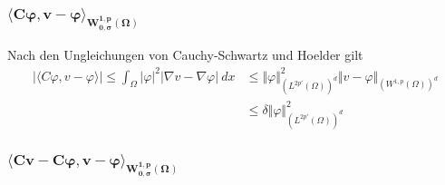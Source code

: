 \documentclass{article}
\begin{document}
\subsubsection*{$\bm{\langle C \varphi, v - \varphi \rangle_{W_{0, \sigma}^{1,p} (\Omega)}}$}

Nach den Ungleichungen von Cauchy-Schwartz und Hoelder gilt
\begin{equation*}
  \begin{aligned}
    \vert \langle C \varphi, v - \varphi \rangle\vert
    \leq \int_{\Omega}^{} \vert \varphi \vert^2 \vert \nabla v - \nabla \varphi \vert  \ dx
    &\leq \Vert \varphi \Vert_{(L^{2 p'}(\Omega))^d}^2 \Vert v - \varphi \Vert_{(W^{1, p}(\Omega))^d} \\
    &\leq \delta \Vert \varphi \Vert_{(L^{2 p'}(\Omega))^d}^2 
  \end{aligned}
\end{equation*}

\subsubsection*{$\bm{\langle Cv - C \varphi, v - \varphi \rangle_{W_{0, \sigma}^{1,p} (\Omega)}}$}
\end{document}
